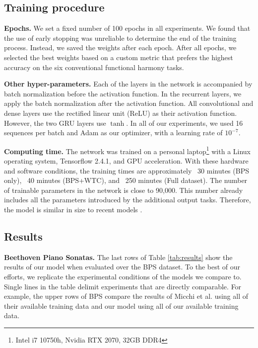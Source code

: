 \documentclass{article}
\begin{document}
\subsection{Training procedure}

\textbf{Epochs.}
We set a fixed number of 100 epochs in all experiments. 
We found that the use of early stopping was unreliable to determine the end of the training process.
Instead, we saved the weights after each epoch. 
After all epochs, we selected the best weights based on a custom metric that prefers the highest accuracy on the six conventional functional harmony tasks.

\textbf{Other hyper-parameters.}
Each of the layers in the network is accompanied by batch normalization before the activation function. In the recurrent layers, we apply the batch normalization after the activation function. All convolutional and dense layers use the rectified linear unit (ReLU) as their activation function. However, the two GRU layers use $\tanh$. In all of our experiments, we used 16 sequences per batch and Adam \cite{kingma2014adam} as our optimizer, with a learning rate of $10^{-7}$.



\textbf{Computing time.} The network was trained on a personal laptop\footnote{Intel i7 10750h, Nvidia RTX 2070, 32GB DDR4} with a Linux operating system, Tensorflow 2.4.1, and GPU acceleration.
With these hardware and software conditions, the training times are approximately ~30 minutes (BPS only), ~40 minutes (BPS+WTC), and ~250 minutes (Full dataset). 
The number of trainable parameters in the network is close to 90,000. This number already includes all the parameters introduced by the additional output tasks. Therefore, the model is similar in size to recent models \cite{micchi2020not, chen2021attend}.

\subsection{Results}


\textbf{Beethoven Piano Sonatas.} The last rows of Table \ref{tab:results} show the results of our model when evaluated over the BPS dataset. 
To the best of our efforts, we replicate the experimental conditions of the models we compare to. Single lines in the table delimit experiments that are directly comparable. 
For example, the upper rows of BPS compare the results of Micchi et al. \cite{micchi2020not} using all of their available training data and our model using all of our available training data. 
\end{document}
